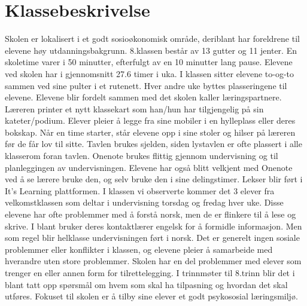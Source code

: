 \documentclass[main.tex]{subfiles}
\begin{document}
\appendix
\section{ Klassebeskrivelse}
Skolen er lokalisert i et godt sosioøkonomisk område, deriblant har foreldrene til elevene høy
utdanningsbakgrunn. 8.klassen består av 13 gutter og 11 jenter. En skoletime varer i 50
minutter, efterfulgt av en 10 minutter lang pause. Elevene ved skolen har i gjennomsnitt 27.6
timer i uka. I klassen sitter elevene to-og-to sammen ved sine pulter i et rutenett. Hver andre
uke byttes plasseringene til elevene. Elevene blir fordelt sammen med det skolen kaller
læringspartnere. Læreren printer et nytt klassekart som han/hun har tilgjengelig på sin
kateter/podium. Elever pleier å legge fra sine mobiler i en hylleplass eller deres bokskap. Når en
time starter, står elevene opp i sine stoler og hilser på læreren før de får lov til sitte. Tavlen
brukes sjelden, siden lystavlen er ofte plassert i alle klasserom foran tavlen. Onenote brukes
flittig gjennom undervisning og til planleggingen av undervisningen. Elevene har også blitt
velkjent med Onenote ved å se lærere bruke den, og selv bruke den i sine delingstimer. Lekser
blir ført i It’s Learning plattformen. I klassen vi observerte kommer det 3 elever fra
velkomstklassen som deltar i undervisning torsdag og fredag hver uke. Disse elevene har ofte
problemmer med å forstå norsk, men de er flinkere til å lese og skrive. I blant bruker deres
kontaktlærer engelsk for å formidle informasjon. Men som regel blir helklasse undervisningen
ført i norsk. Det er generelt ingen sosiale problemmer eller konflikter i klassen, og elevene pleier
å samarbeide med hverandre uten store problemmer. Skolen har en del problemmer med
elever som trenger en eller annen form for tilrettelegging. I trinnmøter til 8.trinn blir det i blant tatt
opp spørsmål om hvem som skal ha tilpasning og hvordan det skal utføres. Fokuset til skolen er
å tilby sine elever et godt psykososial læringsmiljø.
\end{document}
